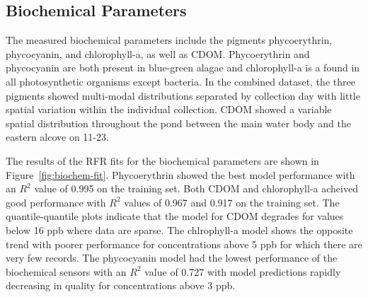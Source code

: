\documentclass[sensors,article,submit,pdftex,moreauthors]{Definitions/mdpi}
\begin{document}
\subsection{Biochemical Parameters}

The measured biochemical parameters include the pigments phycoerythrin, phycocyanin, and chlorophyll-a, as well as CDOM. Phycoerythrin and phycocyanin are both present in blue-green alagae and chlorophyll-a is a found in all photosynthetic organisms except bacteria. In the combined dataset, the three pigments showed multi-modal distributions separated by collection day with little spatial variation within the individual collection. CDOM showed a variable spatial distribution throughout the pond between the main water body and the eastern alcove on 11-23.

The results of the RFR fits for the biochemical parameters are shown in Figure~\ref{fig:biochem-fit}. Phycoerythrin showed the best model performance with an $R^2$ value of 0.995 on the training set. Both CDOM and chlorophyll-a acheived good performance with $R^2$ values of 0.967 and 0.917 on the training set. The quantile-quantile plots indicate that the model for CDOM degrades for values below 16 ppb where data are sparse. The chlrophyll-a model shows the opposite trend with poorer performance for concentrations above 5 ppb for which there are very few records. The phycocyanin model had the lowest performance of the biochemical sensors with an $R^2$ value of 0.727 with model predictions rapidly decreasing in quality for concentrations above 3 ppb. 
\end{document}
